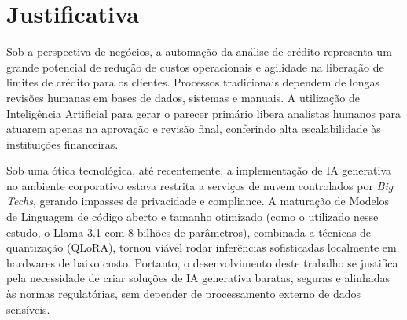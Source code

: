 \section{Justificativa}

Sob a perspectiva de negócios, a automação da análise de crédito representa um grande potencial de redução de custos operacionais e agilidade na liberação de limites de crédito para os clientes. Processos tradicionais dependem de longas revisões humanas em bases de dados, sistemas e manuais. A utilização de Inteligência Artificial para gerar o parecer primário libera analistas humanos para atuarem apenas na aprovação e revisão final, conferindo alta escalabilidade às instituições financeiras.

Sob uma ótica tecnológica, até recentemente, a implementação de IA generativa no ambiente corporativo estava restrita a serviços de nuvem controlados por \textit{Big Techs}, gerando impasses de privacidade e compliance. A maturação de Modelos de Linguagem de código aberto e tamanho otimizado (como o utilizado nesse estudo, o Llama 3.1 com 8 bilhões de parâmetros), combinada a técnicas de quantização (QLoRA), tornou viável rodar inferências sofisticadas localmente em hardwares de baixo custo. Portanto, o desenvolvimento deste trabalho se justifica pela necessidade de criar soluções de IA generativa baratas, seguras e alinhadas às normas regulatórias, sem depender de processamento externo de dados sensíveis.
